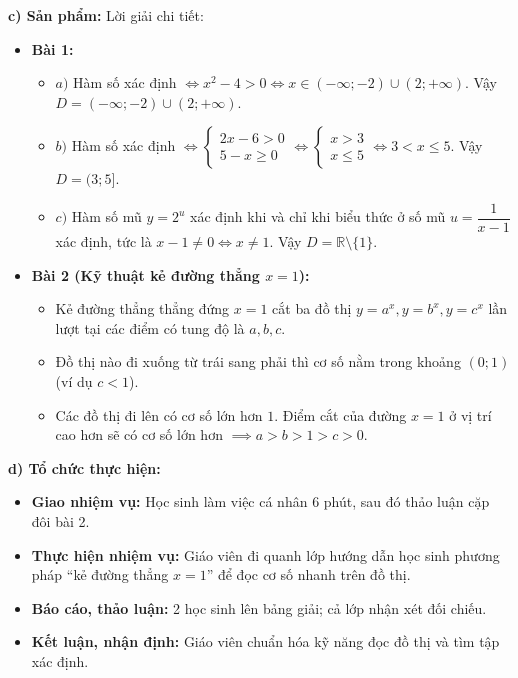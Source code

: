 \documentclass[12pt, a4paper]{article}
\begin{document}
\noindent \textbf{c) Sản phẩm:}
Lời giải chi tiết:
\begin{itemize}
    \item \textbf{Bài 1:}
    \begin{itemize}
        \item $a)$ Hàm số xác định $\iff x^2 - 4 > 0 \iff x \in (-\infty; -2) \cup (2; +\infty)$.
        Vậy $D = (-\infty; -2) \cup (2; +\infty)$.
        \item $b)$ Hàm số xác định $\iff \begin{cases} 2x - 6 > 0 \\ 5 - x \ge 0 \end{cases} \iff \begin{cases} x > 3 \\ x \le 5 \end{cases} \iff 3 < x \le 5$.
        Vậy $D = (3; 5]$.
        \item $c)$ Hàm số mũ $y = 2^u$ xác định khi và chỉ khi biểu thức ở số mũ $u = \dfrac{1}{x - 1}$ xác định, tức là $x - 1 \neq 0 \iff x \neq 1$.
        Vậy $D = \mathbb{R} \setminus \{1\}$.
    \end{itemize}
    \item \textbf{Bài 2 (Kỹ thuật kẻ đường thẳng $x = 1$):}
    \begin{itemize}
        \item Kẻ đường thẳng thẳng đứng $x = 1$ cắt ba đồ thị $y = a^x, y = b^x, y = c^x$ lần lượt tại các điểm có tung độ là $a, b, c$.
        \item Đồ thị nào đi xuống từ trái sang phải thì cơ số nằm trong khoảng $(0; 1)$ (ví dụ $c < 1$).
        \item Các đồ thị đi lên có cơ số lớn hơn $1$. Điểm cắt của đường $x = 1$ ở vị trí cao hơn sẽ có cơ số lớn hơn $\implies a > b > 1 > c > 0$.
    \end{itemize}
\end{itemize}

\noindent \textbf{d) Tổ chức thực hiện:}
\begin{itemize}[leftmargin=0.6cm]
    \item \textbf{Giao nhiệm vụ:} Học sinh làm việc cá nhân 6 phút, sau đó thảo luận cặp đôi bài 2.
    \item \textbf{Thực hiện nhiệm vụ:} Giáo viên đi quanh lớp hướng dẫn học sinh phương pháp “kẻ đường thẳng $x = 1$” để đọc cơ số nhanh trên đồ thị.
    \item \textbf{Báo cáo, thảo luận:} 2 học sinh lên bảng giải; cả lớp nhận xét đối chiếu.
    \item \textbf{Kết luận, nhận định:} Giáo viên chuẩn hóa kỹ năng đọc đồ thị và tìm tập xác định.
\end{itemize}
\end{document}
